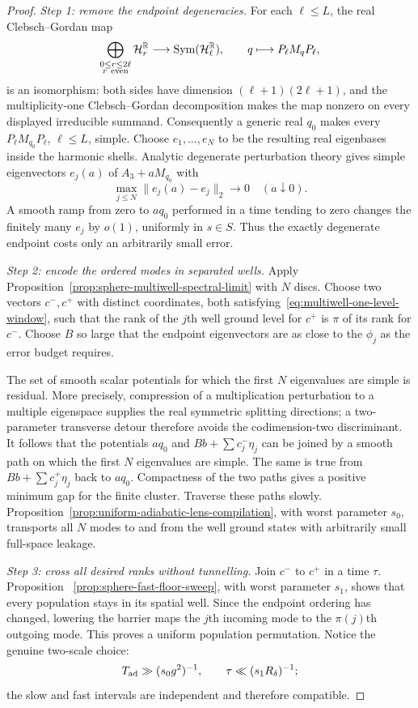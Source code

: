 \documentclass[11pt]{article}
\theoremstyle{remark}
\begin{document}
\begin{proof}
\emph{Step 1: remove the endpoint degeneracies.}
For each $\ell\leq L$, the real Clebsch--Gordan map
\[
 \bigoplus_{\substack{0\leq r\leq2\ell\\r\ {\rm even}}}\mathcal H_r^\mathbb R
 \longrightarrow
 \operatorname{Sym}(\mathcal H_\ell^\mathbb R),
 \qquad
 q\longmapsto P_\ell M_qP_\ell ,
 \label{eq:cg-symmetric-compression}
\]
is an isomorphism: both sides have dimension
$(\ell+1)(2\ell+1)$, and the multiplicity-one Clebsch--Gordan
decomposition makes the map nonzero on every displayed irreducible
summand.  Consequently a generic real $q_0$ makes every
$P_\ell M_{q_0}P_\ell$, $\ell\leq L$, simple.  Choose $e_1,\ldots,e_N$
to be the resulting real eigenbases inside the harmonic shells.  Analytic
degenerate perturbation theory gives simple eigenvectors
$e_j(a)$ of $A_3+aM_{q_0}$ with
\[
 \max_{j\leq N}\|e_j(a)-e_j\|_2\longrightarrow0
 \quad(a\downarrow0).
 \]
A smooth ramp from zero to $a q_0$ performed in a time tending to zero
changes the finitely many $e_j$ by $o(1)$, uniformly in $s\in S$.
Thus the exactly degenerate endpoint costs only an arbitrarily small
error.

\emph{Step 2: encode the ordered modes in separated wells.}
Apply Proposition~\ref{prop:sphere-multiwell-spectral-limit} with $N$
discs.  Choose two vectors $c^-,c^+$ with distinct coordinates, both
satisfying~\eqref{eq:multiwell-one-level-window}, such that the rank of
the $j$th well ground level for $c^+$ is $\pi$ of its rank for $c^-$.
Choose $B$ so large that the endpoint eigenvectors are as close to the
$\phi_j$ as the error budget requires.

The set of smooth scalar potentials for which the first $N$ eigenvalues
are simple is residual.  More precisely, compression of a multiplication
perturbation to a multiple eigenspace supplies the real symmetric
splitting directions; a two-parameter transverse detour therefore avoids
the codimension-two discriminant.  It follows that the potentials
$a q_0$ and $Bb+\sum c_j^- \eta_j$ can be joined by a smooth path on
which the first $N$ eigenvalues are simple.  The same is true from
$Bb+\sum c_j^+\eta_j$ back to $a q_0$.  Compactness of the two paths
gives a positive minimum gap for the finite cluster.  Traverse these paths
slowly.  Proposition~\ref{prop:uniform-adiabatic-lens-compilation}, with
worst parameter $s_0$, transports all $N$ modes to and from the well
ground states with arbitrarily small full-space leakage.

\emph{Step 3: cross all desired ranks without tunnelling.}
Join $c^-$ to $c^+$ in a time $\tau$.  Proposition
~\ref{prop:sphere-fast-floor-sweep}, with worst parameter $s_1$, shows
that every population stays in its spatial well.  Since the endpoint
ordering has changed, lowering the barrier maps the $j$th incoming mode to
the $\pi(j)$th outgoing mode.  This proves a uniform population
permutation.  Notice the genuine two-scale choice:
\[
 T_{\rm ad}\gg (s_0g^2)^{-1},
 \qquad
 \tau\ll (s_1R_\delta)^{-1};
\]
the slow and fast intervals are independent and therefore compatible.


\end{proof}
\end{document}
